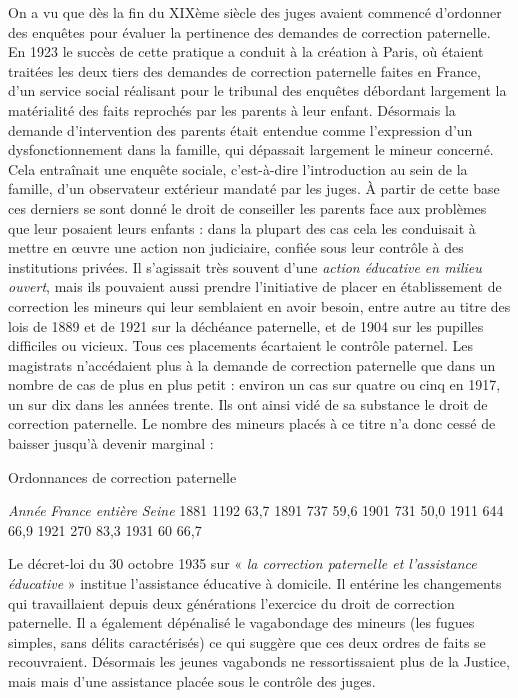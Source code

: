  On a vu que dès la fin du XIXème siècle des juges avaient commencé d'ordonner des enquêtes pour évaluer la pertinence des demandes de correction paternelle. En 1923 le succès de cette pratique a conduit à la création à Paris, où étaient traitées les deux tiers des demandes de correction paternelle faites en France, d'un service social réalisant pour le tribunal des enquêtes débordant largement la matérialité des faits reprochés par les parents à leur enfant. Désormais la demande d'intervention des parents était entendue comme l'expression d'un dysfonctionnement dans la famille, qui dépassait largement le mineur concerné. Cela entraînait une enquête sociale, c'est-à-dire l'introduction au sein de la famille, d'un observateur extérieur mandaté par les juges. À partir de cette base ces derniers se sont donné le droit de conseiller les parents face aux problèmes que leur posaient leurs enfants : dans la plupart des cas cela les conduisait à mettre en œuvre une action non judiciaire, confiée sous leur contrôle à des institutions privées. Il s'agissait très souvent d'une \emph{action éducative en milieu ouvert}, mais ils pouvaient aussi prendre l'initiative de placer en établissement de correction les mineurs qui leur semblaient en avoir besoin, entre autre au titre des lois de 1889 et de 1921 sur la déchéance paternelle, et de 1904 sur les pupilles difficiles ou vicieux. Tous ces placements écartaient le contrôle paternel.
 Les magistrats n'accédaient plus à la demande de correction paternelle que dans un nombre de cas de plus en plus petit : environ un cas sur quatre ou cinq en 1917, un sur dix dans les années trente. Ils ont ainsi vidé de sa substance le droit de correction paternelle. Le nombre des mineurs placés à ce titre n'a donc cessé de baisser jusqu'à devenir marginal :
 
 
 Ordonnances de correction paternelle 
 
 \emph{Année}
 \emph{}
\emph{France entière}
 \emph{Seine}
 1881
 1192
 63,7 %
 1891
 737
 59,6 %
 1901
 731
 50,0 %
 1911
 644
 66,9 %
 1921
 270
 83,3%
 1931
 60
 66,7 %
 
 Le décret-loi du 30 octobre 1935 sur « \emph{la correction paternelle et l'assistance éducative} » institue l'assistance éducative à domicile. Il entérine les changements qui travaillaient depuis deux générations l'exercice du droit de correction paternelle. Il a également dépénalisé le vagabondage des mineurs (les fugues simples, sans délits caractérisés) ce qui suggère que ces deux ordres de faits se recouvraient. Désormais les jeunes vagabonds ne ressortissaient plus de la Justice, mais mais d'une assistance placée sous le contrôle des juges. 
 
